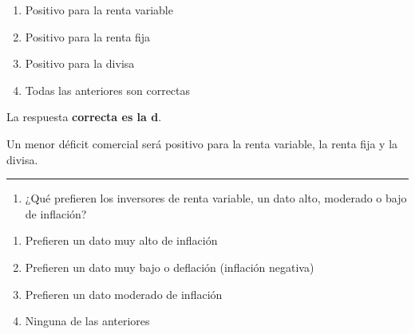 \documentclass[
  letterpaper,
  DIV=11,
  numbers=noendperiod]{scrreprt}
\providecommand{\tightlist}{%
  \setlength{\itemsep}{0pt}\setlength{\parskip}{0pt}}\usepackage{longtable,booktabs,array}
\begin{document}
\begin{enumerate}
\def\labelenumi{\alph{enumi})}
\item
  Positivo para la renta variable
\item
  Positivo para la renta fija
\item
  Positivo para la divisa
\item
  Todas las anteriores son correctas
\end{enumerate}

\begin{tcolorbox}[enhanced jigsaw, left=2mm, opacityback=0, colback=white, breakable, arc=.35mm, bottomrule=.15mm, rightrule=.15mm, toprule=.15mm, leftrule=.75mm, colframe=quarto-callout-tip-color-frame]
\begin{minipage}[t]{5.5mm}
\textcolor{quarto-callout-tip-color}{\faLightbulb}
\end{minipage}%
\begin{minipage}[t]{\textwidth - 5.5mm}

La respuesta \textbf{correcta es la d}.

Un menor déficit comercial será positivo para la renta variable, la
renta fija y la divisa.

\end{minipage}%
\end{tcolorbox}

\begin{center}\rule{0.5\linewidth}{0.5pt}\end{center}

\begin{enumerate}
\def\labelenumi{\arabic{enumi}.}
\setcounter{enumi}{43}
\tightlist
\item
  ¿Qué prefieren los inversores de renta variable, un dato alto,
  moderado o bajo de inflación?
\end{enumerate}

\begin{enumerate}
\def\labelenumi{\alph{enumi})}
\item
  Prefieren un dato muy alto de inflación
\item
  Prefieren un dato muy bajo o deflación (inflación negativa)
\item
  Prefieren un dato moderado de inflación
\item
  Ninguna de las anteriores
\end{enumerate}
\end{document}
